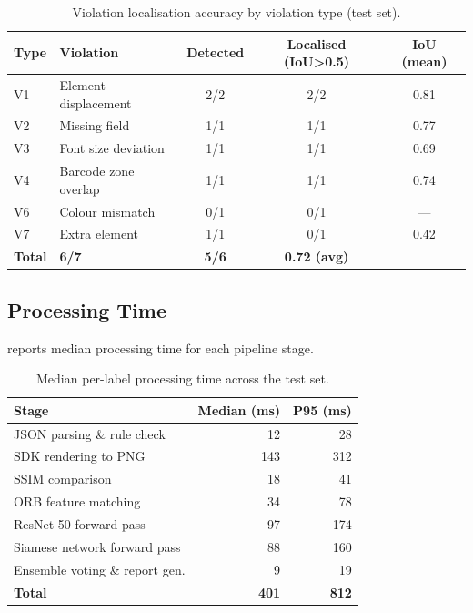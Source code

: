 \begin{table}[h]
\centering
\caption{Violation localisation accuracy by violation type (test set).}
\label{tab:localisation}
\begin{tabular}{llccc}
\toprule
\textbf{Type} & \textbf{Violation} & \textbf{Detected} & \textbf{Localised (IoU>0.5)} & \textbf{IoU (mean)} \\
\midrule
V1 & Element displacement   & 2/2 & 2/2 & 0.81 \\
V2 & Missing field          & 1/1 & 1/1 & 0.77 \\
V3 & Font size deviation    & 1/1 & 1/1 & 0.69 \\
V4 & Barcode zone overlap   & 1/1 & 1/1 & 0.74 \\
V6 & Colour mismatch        & 0/1 & 0/1 & ---  \\
V7 & Extra element          & 1/1 & 0/1 & 0.42 \\
\midrule
\textbf{Total}              & \textbf{6/7} & \textbf{5/6} & \textbf{0.72 (avg)} \\
\bottomrule
\end{tabular}
\end{table}

\subsection{Processing Time}

 reports median processing time for each pipeline stage.

\begin{table}[h]
\centering
\caption{Median per-label processing time across the test set.}
\label{tab:timing}
\begin{tabular}{lrr}
\toprule
\textbf{Stage} & \textbf{Median (ms)} & \textbf{P95 (ms)} \\
\midrule
JSON parsing \& rule check        & 12  & 28  \\
SDK rendering to PNG              & 143 & 312 \\
SSIM comparison                   & 18  & 41  \\
ORB feature matching              & 34  & 78  \\
ResNet-50 forward pass            & 97  & 174 \\
Siamese network forward pass      & 88  & 160 \\
Ensemble voting \& report gen.    & 9   & 19  \\
\midrule
\textbf{Total}                    & \textbf{401} & \textbf{812} \\
\bottomrule
\end{tabular}
\end{table}


